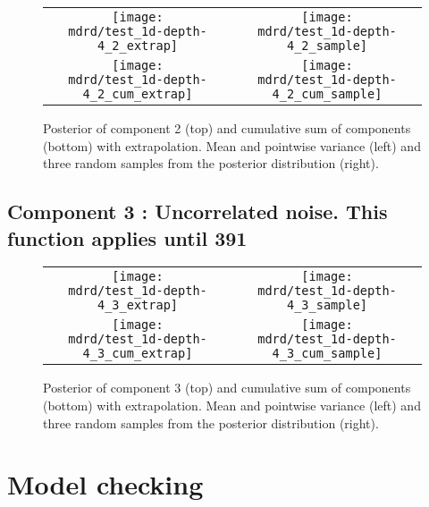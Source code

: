 \documentclass{article} %
\begin{document}


\begin{figure}[H]
\newcommand{\wmgd}{0.5\columnwidth}
\newcommand{\hmgd}{3.0cm}
\newcommand{\mdrd}{test_1d-depth-4}
\newcommand{\mbm}{\hspace{-0.3cm}}
\begin{tabular}{cc}
\mbm \texttt{[image: \\mdrd/test\_1d-depth-4\_2\_extrap]} & \texttt{[image: \\mdrd/test\_1d-depth-4\_2\_sample]} \\
\mbm \texttt{[image: \\mdrd/test\_1d-depth-4\_2\_cum\_extrap]} & \texttt{[image: \\mdrd/test\_1d-depth-4\_2\_cum\_sample]}
\end{tabular}
\caption{Posterior of component 2 (top) and cumulative sum of components (bottom) with extrapolation. Mean and pointwise variance (left) and three random samples from the posterior distribution (right).}
\label{fig:extrap2}
\end{figure}

\subsection{Component 3 : Uncorrelated noise. This function applies until  391}



\begin{figure}[H]
\newcommand{\wmgd}{0.5\columnwidth}
\newcommand{\hmgd}{3.0cm}
\newcommand{\mdrd}{test_1d-depth-4}
\newcommand{\mbm}{\hspace{-0.3cm}}
\begin{tabular}{cc}
\mbm \texttt{[image: \\mdrd/test\_1d-depth-4\_3\_extrap]} & \texttt{[image: \\mdrd/test\_1d-depth-4\_3\_sample]} \\
\mbm \texttt{[image: \\mdrd/test\_1d-depth-4\_3\_cum\_extrap]} & \texttt{[image: \\mdrd/test\_1d-depth-4\_3\_cum\_sample]}
\end{tabular}
\caption{Posterior of component 3 (top) and cumulative sum of components (bottom) with extrapolation. Mean and pointwise variance (left) and three random samples from the posterior distribution (right).}
\label{fig:extrap3}
\end{figure}

\section{Model checking}
\label{sec:check}
\end{document}
